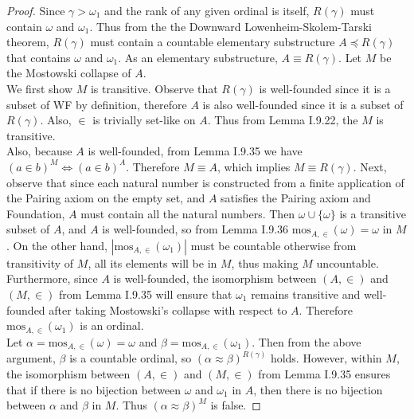 \documentclass{article}
\begin{document}
  \begin{proof}
    Since $\gamma>\omega_1$ and the rank of any given ordinal is itself,
    $R(\gamma)$ must contain $\omega$ and $\omega_1$. Thus from the
    the Downward Lowenheim-Skolem-Tarski theorem, $R(\gamma)$ must contain
    a countable elementary substructure $A\preceq R(\gamma)$ that contains
    $\omega$ and $\omega_1$. As an elementary substructure, $A\equiv
    R(\gamma)$. Let $M$ be the Mostowski collapse of $A$. \\
    
    We first show $M$ is transitive. Observe that $R(\gamma)$ is
    well-founded since it is a subset of WF by definition, therefore $A$ is
    also well-founded since it is a subset of $R(\gamma)$. Also, $\in$ is
    trivially set-like on $A$. Thus from Lemma I.9.22, the $M$ is
    transitive. \\

    Also, because $A$ is well-founded, from Lemma I.9.35 we have $(a\in
    b)^M \Leftrightarrow (a\in b)^A$. Therefore $M\equiv A$, which implies
    $M\equiv R(\gamma)$. Next, observe that since each natural number is
    constructed from a finite application of the Pairing axiom on the empty
    set, and $A$ satisfies the Pairing axiom and Foundation, $A$ must
    contain all the natural numbers. Then $\omega\cup\{\omega\}$ is a
    transitive subset of $A$, and $A$ is well-founded, so from Lemma I.9.36
    $\text{mos}_{A,\in}(\omega)=\omega$ in $M$. On the other hand,
    $|\text{mos}_{A,\in}(\omega_1)|$ must be countable otherwise from
    transitivity of $M$, all its elements will be in $M$, thus making $M$
    uncountable. Furthermore, since $A$ is well-founded, the isomorphism
    between $(A,\in)$ and $(M,\in)$ from Lemma I.9.35 will ensure that
    $\omega_1$ remains transitive and well-founded after taking Mostowski's
    collapse with respect to $A$. Therefore $\text{mos}_{A,\in}(\omega_1)$
    is an ordinal. \\

    Let $\alpha=\text{mos}_{A,\in}(\omega)=\omega$ and
    $\beta=\text{mos}_{A,\in}(\omega_1)$. Then from the above argument,
    $\beta$ is a countable ordinal, so $(\alpha\approx\beta)^{R(\gamma)}$
    holds. However, within $M$, the isomorphism between $(A,\in)$ and
    $(M,\in)$ from Lemma I.9.35 ensures that if there is no bijection
    between $\omega$ and $\omega_1$ in $A$, then there is no bijection
    between $\alpha$ and $\beta$ in $M$. Thus
    $(\alpha\approx\beta)^{M}$ is false.
  \end{proof}
\end{document}
